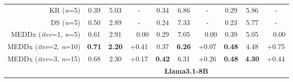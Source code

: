 \begin{table*}[ht]
\begin{tabular}{rccccccccc}
KR (\textit{n}=5)  &      0.39      & 5.03   &  -  &  0.34  &  6.86       & -  &     0.29   &   5.86 &    -   \\
DS (\textit{n}=5)  &     0.50      &  2.89 &  -  & 0.24 &    7.33   & -  &   0.23    &  5.77  &    -   \\\cmidrule(lr){2-10}
MEDDx (\textit{iter}=1, \textit{n}=5)                       & 0.61           & 2.91    & ~~0.00  & 0.29        & 7.05       & ~~0.00   & 0.39         & 5.05   &     ~~0.00   \\
MEDDx (\textit{iter}=2, \textit{n}=10)                       & \textbf{0.71}   & \textbf{2.20}      & +0.41 & 0.37        & \textbf{6.26}      & +0.07   & \textbf{0.48}         & 4.48  &    +0.75     \\
MEDDx (\textit{iter}=3, \textit{n}=15)                       & 0.68   & 2.30    & +0.17  & \textbf{0.42}        & 6.31     &   +0.26   & \textbf{0.48}         & \textbf{4.30}      &   +0.44  \\\midrule
                               & \multicolumn{9}{c}{\textbf{Llama3.1-8B}}                                                            \\\midrule

\end{tabular}
\end{table*}
